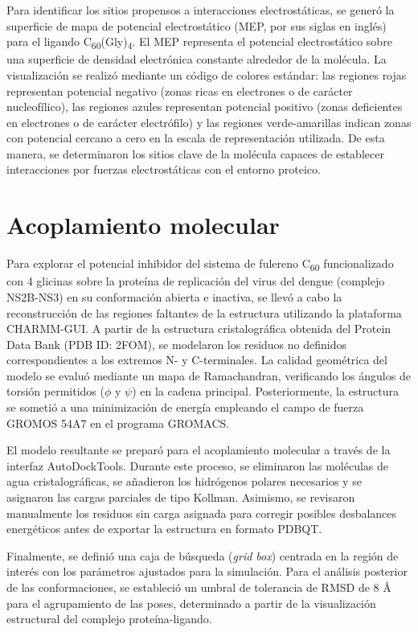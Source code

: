 Para identificar los sitios propensos a interacciones electrostáticas, se generó la superficie de mapa de potencial electrostático (MEP, por sus siglas en inglés) para el ligando C\textsubscript{60}(Gly)\textsubscript{4}. El MEP representa el potencial electrostático sobre una superficie de densidad electrónica constante alrededor de la molécula. La visualización se realizó mediante un código de colores estándar: las regiones rojas representan potencial negativo (zonas ricas en electrones o de carácter nucleofílico), las regiones azules representan potencial positivo (zonas deficientes en electrones o de carácter electrófilo) y las regiones verde-amarillas indican zonas con potencial cercano a cero en la escala de representación utilizada. De esta manera, se determinaron los sitios clave de la molécula capaces de establecer interacciones por fuerzas electrostáticas con el entorno proteico.

\section{Acoplamiento molecular}
Para explorar el potencial inhibidor del sistema de fulereno C\textsubscript{60} funcionalizado con 4 glicinas sobre la proteína de replicación del virus del dengue (complejo NS2B-NS3) en su conformación abierta e inactiva, se llevó a cabo la reconstrucción de las regiones faltantes de la estructura utilizando la plataforma CHARMM-GUI. A partir de la estructura cristalográfica obtenida del Protein Data Bank (PDB ID: 2FOM), se modelaron los residuos no definidos correspondientes a los extremos N- y C-terminales. La calidad geométrica del modelo se evaluó mediante un mapa de Ramachandran, verificando los ángulos de torsión permitidos ($\phi$ y $\psi$) en la cadena principal. Posteriormente, la estructura se sometió a una minimización de energía empleando el campo de fuerza GROMOS 54A7 en el programa GROMACS.

El modelo resultante se preparó para el acoplamiento molecular a través de la interfaz AutoDockTools. Durante este proceso, se eliminaron las moléculas de agua cristalográficas, se añadieron los hidrógenos polares necesarios y se asignaron las cargas parciales de tipo Kollman. Asimismo, se revisaron manualmente los residuos sin carga asignada para corregir posibles desbalances energéticos antes de exportar la estructura en formato PDBQT.

Finalmente, se definió una caja de búsqueda (\textit{grid box}) centrada en la región de interés con los parámetros ajustados para la simulación. Para el análisis posterior de las conformaciones, se estableció un umbral de tolerancia de RMSD de 8 Å para el agrupamiento de las poses, determinado a partir de la visualización estructural del complejo proteína-ligando.

